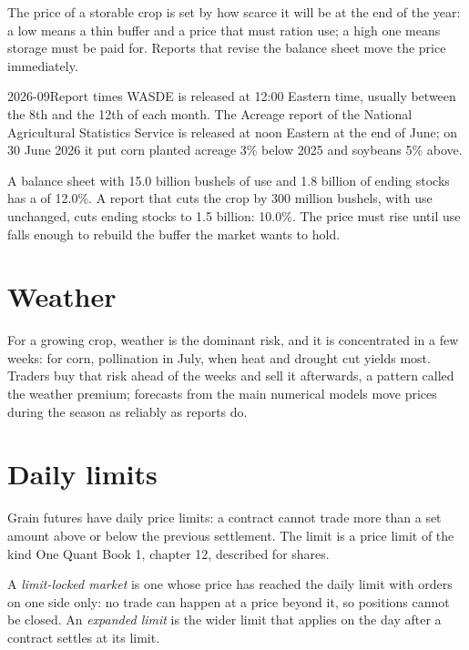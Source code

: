 The price of a storable crop is set by how scarce it will be at the end of the year: a low
 means a thin buffer and a price that must ration use; a high one means storage
must be paid for. Reports that revise the balance sheet move the price immediately.

\begin{dated}{2026-09}{Report times}\label{dat:m3:agriculturals-and-softs:reports}
WASDE is released at 12:00 Eastern time, usually between the 8th and the 12th of each month. The
Acreage report of the National Agricultural Statistics Service is released at noon Eastern at the end of
June; on 30 June 2026 it put corn planted acreage 3\% below 2025 and soybeans 5\% above.
\end{dated}

\begin{example}\label{ex:m3:agriculturals-and-softs:stu}
A balance sheet with 15.0 billion bushels of use and 1.8 billion of ending stocks has a  of 12.0\%. A report that cuts the crop by 300 million bushels, with use unchanged, cuts ending
stocks to 1.5 billion: 10.0\%. The price must rise until use falls enough to rebuild the buffer the
market wants to hold.
\end{example}

\section{Weather}

For a growing crop, weather is the dominant risk, and it is concentrated in a few weeks: for corn,
pollination in July, when heat and drought cut yields most. Traders buy that risk ahead of the
weeks and sell it afterwards, a pattern called the weather premium; forecasts from the main
numerical models move prices during the season as reliably as reports do.

\section{Daily limits}

Grain futures have daily price limits: a contract cannot trade more than a set amount above or
below the previous settlement. The limit is a price limit of the kind One Quant Book 1, chapter 12,
described for shares.

\begin{definition}\label{def:m3:agriculturals-and-softs:limit}
A \emph{limit-locked market} is one whose price has reached the daily limit
with orders on one side only: no trade can happen at a price beyond it, so positions cannot be closed.
An \emph{expanded limit} is the wider limit that applies on the day after a
contract settles at its limit.
\end{definition}

